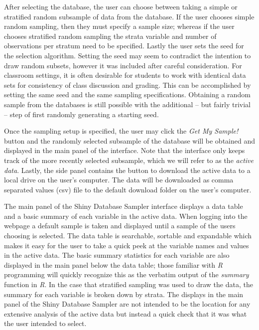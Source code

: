 \documentclass[11pt]{isuthesis}\usepackage[]{graphicx}\usepackage[]{color}
\begin{document}
After selecting the database, the user can choose between taking a simple or stratified random subsample of data from the database. If the user chooses simple random sampling, then they must specify a sample size; whereas if the user chooses stratified random sampling the strata variable and number of observations per stratum need to be specified. Lastly the user sets the seed for the selection algorithm. Setting the seed may seem to contradict the intention to draw random subsets, however it was included after careful consideration. For classroom settings, it is often desirable for students to work with identical data sets for consistency of class discussion and grading. This can be accomplished by setting the same seed and the same sampling specifications. Obtaining a random sample from the databases is still possible with the additional -- but fairly trivial -- step of first randomly generating a starting seed. 

Once the sampling setup is specified, the user may click the \textit{Get My Sample!} button and the randomly selected subsample of the database will be obtained and displayed in the main panel of the interface. Note that the interface only keeps track of the more recently selected subsample, which we will refer to as the \textit{active data}. Lastly, the side panel contains the button to download the active data to a local drive on the user's computer.  The data will be downloaded as comma separated values (csv) file to the default download folder on the user's computer.

The main panel of the Shiny Database Sampler interface displays a data table and a basic summary of each variable in the active data. When logging into the webpage a default sample is taken and displayed until a sample of the users choosing is selected. The data table is searchable, sortable and expandable which makes it easy for the user to take a quick peek at the variable names and values in the active data. The basic summary statistics for each variable are also displayed in the main panel below the data table; those familiar with \textit{R} programming will quickly recognize this as the verbatim output of the \textit{summary} function in \textit{R}. In the case that stratified sampling was used to draw the data, the summary for each variable is broken down by strata. The displays in the main panel of the Shiny Database Sampler are not intended to be the location for any extensive analysis of the active data but instead a quick check that it was what the user intended to select. 
\end{document}
